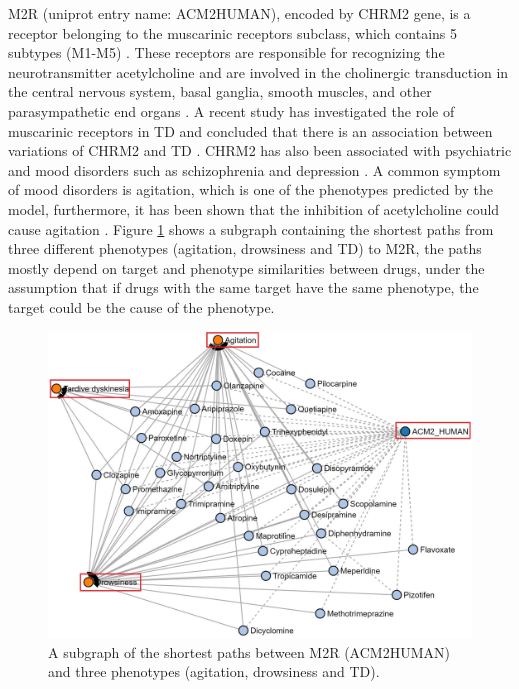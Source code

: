 M2R (uniprot entry name: ACM2\textunderscore HUMAN), encoded by CHRM2 gene, is a receptor belonging to the muscarinic receptors subclass, which contains 5 subtypes (M1-M5) \cite{kleinz_chapter_2008}. These receptors are responsible for recognizing the neurotransmitter acetylcholine and are involved in the cholinergic transduction in the central nervous system, basal ganglia, smooth muscles, and other parasympathetic end organs \cite{aronstam_muscarinic_2009}. A recent study has investigated the role of muscarinic receptors in \ac{TD} and concluded that there is an association between variations of CHRM2 and \ac{TD} \cite{boiko_pharmacogenetics_2019}. CHRM2 has also been associated with psychiatric and mood disorders such as schizophrenia and depression \cite{drevets_antidepressant_2013, jeon_role_2015, dean_possible_2015}. A common symptom of mood disorders is agitation, which is one of the phenotypes predicted by the model, furthermore, it has been shown that the inhibition of acetylcholine could cause agitation \cite{carlson_physiology_2019}. Figure \ref{fig:chrm2_phenotypes} shows a subgraph containing the shortest paths from three different phenotypes (agitation, drowsiness and \ac{TD}) to M2R, the paths mostly depend on target and phenotype similarities between drugs, under the assumption that if drugs with the same target have the same phenotype, the target could be the cause of the phenotype.

\begin{figure}[h!]
    \centering
    \includegraphics[scale=0.6]
    {figures/chrm2_phenotypes.jpg}
    \caption{\label{fig:chrm2_phenotypes} A subgraph of the shortest paths between M2R (ACM2\textunderscore HUMAN) and three phenotypes (agitation, drowsiness and TD).}
\end{figure}


